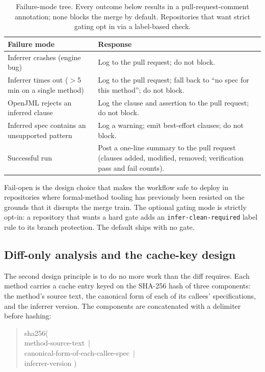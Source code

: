 \begin{table}[ht]
\centering
\caption{Failure-mode tree. Every outcome below results in a pull-request-comment
annotation; none blocks the merge by default. Repositories that want strict
gating opt in via a label-based check.}
\label{tab:ci-failure-tree}
\small
\begin{tabular}{p{4.6cm}p{8.2cm}}
\toprule
\textbf{Failure mode} & \textbf{Response} \\
\midrule
Inferrer crashes (engine bug) & Log to the pull request; do not block. \\
Inferrer times out ($>$5 min on a single method) & Log to the pull request; fall back to ``no spec for this method''; do not block. \\
OpenJML rejects an inferred clause & Log the clause and assertion to the pull request; do not block. \\
Inferred spec contains an unsupported pattern & Log a warning; emit best-effort clauses; do not block. \\
Successful run & Post a one-line summary to the pull request (clauses added, modified, removed; verification pass and fail counts). \\
\bottomrule
\end{tabular}
\end{table}

Fail-open is the design choice that makes the workflow safe to deploy in
repositories where formal-method tooling has previously been resisted on the
grounds that it disrupts the merge train. The optional gating mode is strictly
opt-in: a repository that wants a hard gate adds an
\texttt{infer-clean-required} label rule to its branch protection. The default
ships with no gate.

\subsection{Diff-only analysis and the cache-key design}

The second design principle is to do no more work than the diff requires. Each
method carries a cache entry keyed on the SHA-256 hash of three components: the
method's source text, the canonical form of each of its callees'
specifications, and the inferrer version. The components are concatenated with a
delimiter before hashing:

\begin{quote}\ttfamily\small
sha256(\\
\hspace*{2em}method-source-text\ |\\
\hspace*{2em}canonical-form-of-each-callee-spec\ |\\
\hspace*{2em}inferrer-version )
\end{quote}


